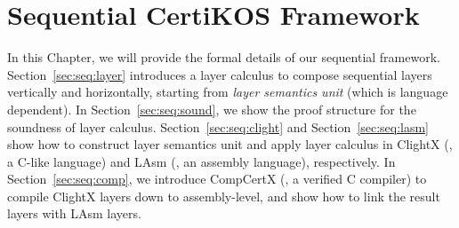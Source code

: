\chapter{Sequential CertiKOS Framework}
\label{chap:seq}
In this Chapter, we will provide the formal details
of our sequential \CTOS{} framework.
Section~\ref{sec:seq:layer} introduces
a layer calculus to compose
sequential layers vertically and
horizontally, starting from \emph{layer semantics unit}
(which is language dependent).
In Section~\ref{sec:seq:sound},
we show the proof structure for the soundness of layer calculus.
Section~\ref{sec:seq:clight}
and Section~\ref{sec:seq:lasm}
show how to construct layer semantics unit
and apply layer calculus
in ClightX (\ie, a C-like language) and LAsm (\ie, an assembly language), respectively.
In Section~\ref{sec:seq:comp},
we introduce CompCertX (\ie, a verified C compiler)
to compile ClightX layers down to assembly-level,
and show how to link the result layers with
LAsm layers.




